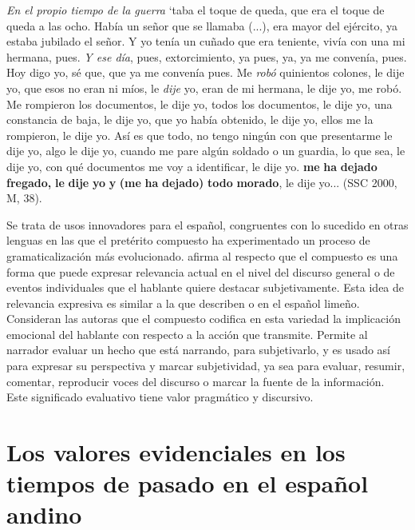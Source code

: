 \documentclass[output=paper]{../langscibook}
\begin{document}
\ea\label{ex:palacios:2}
\textit{En el propio tiempo de la guerra} ‘taba el toque de queda, que era el toque de queda a las ocho. Había un señor que se llamaba (...), era mayor del ejército, ya estaba jubilado el señor. Y yo tenía un cuñado que era teniente, vivía con una mi hermana, pues. \textit{Y ese día}, pues, extorcimiento, ya pues, ya, ya me convenía, pues. Hoy digo yo, sé que, que ya me convenía pues. Me \textit{robó} quinientos colones, le dije yo, que esos no eran ni míos, le \textit{dije} yo, eran de mi hermana, le dije yo, me robó. Me rompieron los documentos, le dije yo, todos los documentos, le dije yo, una constancia de baja, le dije yo, que yo había obtenido, le dije yo, ellos me la rompieron, le dije yo. Así es que todo, no tengo ningún con que presentarme le dije yo, algo le dije yo, cuando me pare algún soldado o un guardia, lo que sea, le dije yo, con qué documentos me voy a identificar, le dije yo. \textbf{me} \textbf{ha} \textbf{dejado} \textbf{fregado,} \textbf{le} \textbf{dije} \textbf{yo} \textbf{y} \textbf{(me} \textbf{ha} \textbf{dejado)} \textbf{todo} \textbf{morado}, le dije yo... (SSC 2000, M, 38).
\z

Se trata de usos innovadores para el español, congruentes con lo sucedido en otras lenguas en las que el pretérito compuesto ha experimentado un proceso de gramaticalización más evolucionado. \citet[17]{Howe2018} afirma al respecto que el compuesto es una forma que puede expresar relevancia actual en el nivel del discurso general o de eventos individuales que el hablante quiere destacar subjetivamente. Esta idea de relevancia expresiva es similar a la que describen  \citet{JaraYupanqui2011} o    \citet{CaravedoKlee2012} en el español limeño. Consideran las autoras que el compuesto codifica en esta variedad la implicación emocional del hablante con respecto a la acción que transmite. Permite al narrador evaluar un hecho que está narrando, para subjetivarlo, y es usado así para expresar su perspectiva y marcar subjetividad, ya sea para evaluar, resumir, comentar, reproducir voces del discurso o marcar la fuente de la información. Este significado evaluativo tiene valor pragmático y discursivo.

\section{Los valores evidenciales en los tiempos de pasado en el español andino}\label{sec:palacios:4}
\end{document}
